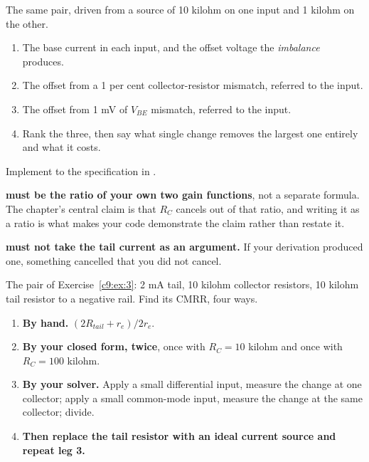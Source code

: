 \label{c9:ex:6}
The same pair, driven from a source of 10 kilohm on one input and 1 kilohm on the other.

\begin{enumerate}
  \item The base current in each input, and the offset voltage the \emph{imbalance} produces.
  \item The offset from a 1 per cent collector-resistor mismatch, referred to the input.
  \item The offset from 1 mV of $V_{BE}$ mismatch, referred to the input.
  \item Rank the three, then say what single change removes the largest one entirely and what it costs.
\end{enumerate}

\label{c9:ex:7}
Implement  to the specification in .

\textbf{ must be the ratio of your own two gain functions}, not a separate formula. The chapter's central claim is that $R_C$ cancels out of that ratio, and writing it as a ratio is what makes your code demonstrate the claim rather than restate it.

\textbf{ must not take the tail current as an argument.} If your derivation produced one, something cancelled that you did not cancel.

\label{c9:ex:8}
The pair of Exercise~\ref{c9:ex:3}: 2 mA tail, 10 kilohm collector resistors, 10 kilohm tail resistor to a negative rail. Find its CMRR, four ways.

\begin{enumerate}
  \item \textbf{By hand.} $(2R_{tail} + r_e)/2r_e$.
  \item \textbf{By your closed form, twice}, once with $R_C = 10$ kilohm and once with $R_C = 100$ kilohm.
  \item \textbf{By your solver.} Apply a small differential input, measure the change at one collector; apply a small common-mode input, measure the change at the same collector; divide.
  \item \textbf{Then replace the tail resistor with an ideal current source and repeat leg 3.}
\end{enumerate}

